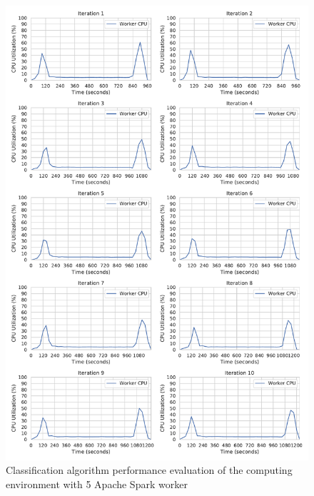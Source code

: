 \begin{figure}[h]
\centering
\includegraphics[scale=0.53]{images/07_evaluation/mortgage/mortgage_5_worker_cpu_performance}
\caption{Classification algorithm performance evaluation of the computing environment with 5 Apache Spark worker}
\label{fig:07_mortgage_static-cpu_results}
\end{figure}

